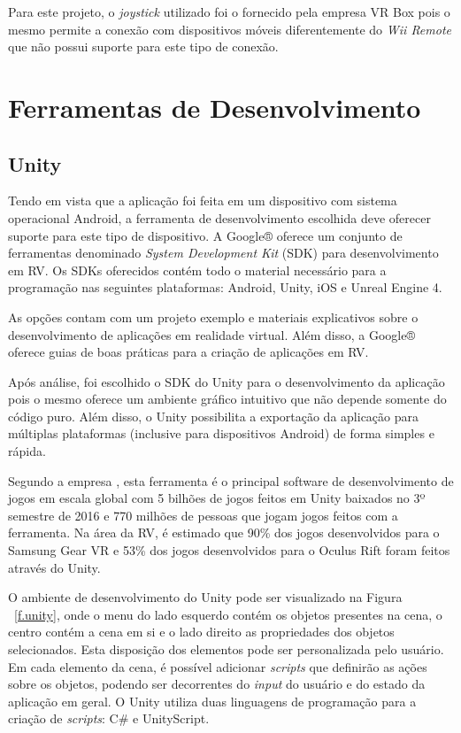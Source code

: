 Para este projeto, o \textit{joystick} utilizado foi o fornecido pela empresa VR Box pois o mesmo permite a conexão com dispositivos móveis diferentemente do \textit{Wii Remote} que não possui suporte para este tipo de conexão.

\section{Ferramentas de Desenvolvimento}
\label{s.ferramentas}

\subsection{Unity}
\label{ss.unity}
Tendo em vista que a aplicação foi feita em um dispositivo com sistema operacional Android, a ferramenta de desenvolvimento escolhida deve oferecer suporte para este tipo de dispositivo. A Google® oferece um conjunto de ferramentas denominado \textit{System Development Kit} (SDK) para desenvolvimento em RV. Os SDKs oferecidos contém todo o material necessário para a programação nas seguintes plataformas: Android, Unity, iOS e Unreal Engine 4. \cite{googledocumentacao} 

As opções contam com um projeto exemplo e materiais explicativos sobre o desenvolvimento de aplicações em realidade virtual. Além disso, a Google® oferece guias de boas práticas para a criação de aplicações em RV. 

Após análise, foi escolhido o SDK do Unity para o desenvolvimento da aplicação pois o mesmo oferece um ambiente gráfico intuitivo que não depende somente do código puro. Além disso, o Unity possibilita a exportação da aplicação para múltiplas plataformas (inclusive para dispositivos Android) de forma simples e rápida.

Segundo a empresa , esta ferramenta é o principal software de desenvolvimento de jogos em escala global com 5 bilhões de jogos feitos em Unity baixados no 3º semestre de 2016 e 770 milhões de pessoas que jogam jogos feitos com a ferramenta. Na área da RV, é estimado que 90\% dos jogos desenvolvidos para o Samsung Gear VR e 53\% dos jogos desenvolvidos para o Oculus Rift foram feitos através do Unity.

O ambiente de desenvolvimento do Unity pode ser visualizado na Figura ~\ref{f.unity}, onde o menu do lado esquerdo contém os objetos presentes na cena, o centro contém a cena em si e o lado direito as propriedades dos objetos selecionados. Esta disposição dos elementos pode ser personalizada pelo usuário. Em cada elemento da cena, é possível adicionar \textit{scripts} que definirão as ações sobre os objetos, podendo ser decorrentes do \textit{input} do usuário e do estado da aplicação em geral. O Unity utiliza duas linguagens de programação para a criação de \textit{scripts}: C\# e UnityScript.  

